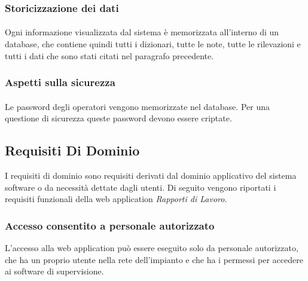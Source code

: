   \subsubsection{Storicizzazione dei dati}
  \paragraph{}
  Ogni informazione visualizzata dal sistema è memorizzata all'interno di un database, che contiene quindi 
  tutti i dizionari, tutte le note, tutte le rilevazioni e tutti i dati che sono stati citati nel paragrafo precedente.

  \subsubsection{Aspetti sulla sicurezza}
  \paragraph{}
  Le password degli operatori vengono memorizzate nel database. Per una questione di sicurezza queste password 
  devono essere criptate. 

  \subsection{Requisiti Di Dominio}
  I requisiti di dominio sono requisiti derivati dal dominio applicativo del sistema software o da necessità
  dettate dagli utenti. Di seguito vengono riportati i requisiti funzionali della web application \textit{Rapporti di Lavoro}.
  
  \subsubsection{Accesso consentito a personale autorizzato}
  L'accesso alla web application può essere eseguito solo da personale autorizzato, che ha un proprio utente 
  nella rete dell'impianto e che ha i permessi per accedere ai software di supervisione.